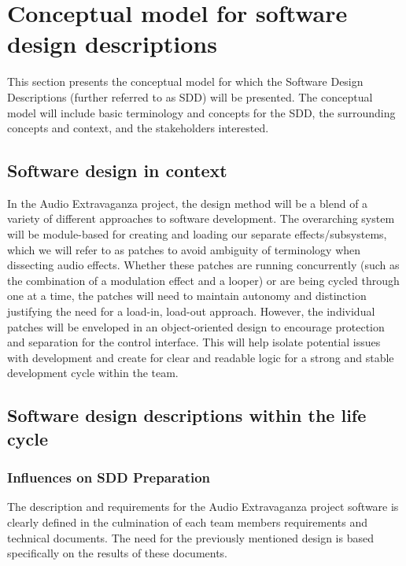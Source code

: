 \section{Conceptual model for software design descriptions}

This section presents the conceptual model for which the Software Design Descriptions (further referred to as SDD) will be presented. The conceptual model will include basic terminology and concepts for the SDD, the surrounding concepts and context, and the stakeholders interested. 

\subsection{Software design in context}
In the Audio Extravaganza project, the design method will be a blend of a variety of different approaches to software development. The overarching system will be module-based for creating and loading our separate effects/subsystems, which we will refer to as patches to avoid ambiguity of terminology when dissecting audio effects. Whether these patches are running concurrently (such as the combination of a modulation effect and a looper) or are being cycled through one at a time, the patches will need to maintain autonomy and distinction justifying the need for a load-in, load-out approach. However, the individual patches will be enveloped in an object-oriented design to encourage protection and separation for the control interface. This will help isolate potential issues with development and create for clear and readable logic for a strong and stable development cycle within the team. 

\subsection{Software design descriptions within the life cycle}
\subsubsection{Influences on SDD Preparation}
The description and requirements for the Audio Extravaganza project software is clearly defined in the culmination of each team member\textsc{}s requirements and technical documents. The need for the previously mentioned design is based specifically on the results of these documents. 


